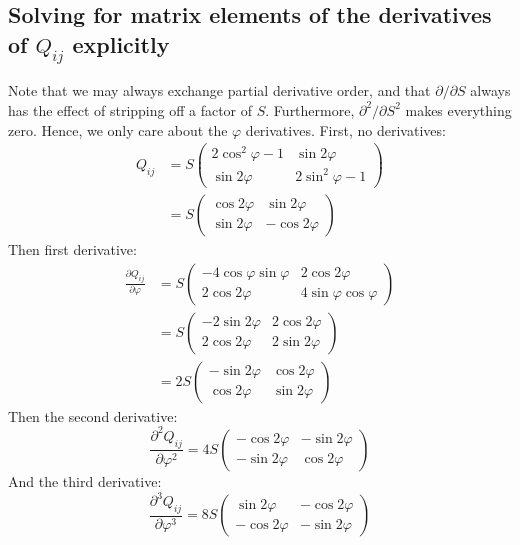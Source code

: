 \documentclass[reqno]{article}
\begin{document}
	\subsection{Solving for matrix elements of the derivatives of $Q_{ij}$ explicitly}
	Note that we may always exchange partial derivative order, and that $\partial/\partial S$ always has the effect of stripping off a factor of $S$. Furthermore, $\partial^2/\partial S^2$ makes everything zero. Hence, we only care about the $\varphi$ derivatives. First, no derivatives:
	\begin{equation}
	\begin{split}
		Q_{ij} &= S
		\begin{pmatrix}
			2\cos^2\varphi - 1 & \sin2\varphi \\
			\sin2\varphi & 2\sin^2\varphi - 1
		\end{pmatrix} \\
		&= S
		\begin{pmatrix}
			\cos2\varphi & \sin2\varphi \\
			\sin2\varphi & -\cos2\varphi
		\end{pmatrix}
	\end{split}
	\end{equation}
	Then first derivative:
	\begin{equation}
	\begin{split}
		\frac{\partial Q_{ij}}{\partial \varphi} &= S
		\begin{pmatrix}
			-4\cos\varphi\sin\varphi & 2\cos2\varphi \\
			2\cos2\varphi & 4\sin\varphi\cos\varphi
		\end{pmatrix} \\
		&= S
		\begin{pmatrix}
			-2\sin2\varphi & 2\cos2\varphi \\
			2\cos2\varphi & 2\sin2\varphi
		\end{pmatrix}\\
		&= 2S
		\begin{pmatrix}
		-\sin2\varphi & \cos2\varphi \\
		\cos2\varphi & \sin2\varphi
		\end{pmatrix}
	\end{split}
	\end{equation}
	Then the second derivative:
	\begin{equation}
		\frac{\partial^2 Q_{ij}}{\partial \varphi^2} = 4S
		\begin{pmatrix}
			-\cos2\varphi & -\sin2\varphi \\
			-\sin2\varphi & \cos2\varphi
		\end{pmatrix}
	\end{equation}
	And the third derivative:
	\begin{equation}
		\frac{\partial^3 Q_{ij}}{\partial \varphi^3} = 8S
		\begin{pmatrix}
			\sin2\varphi & -\cos2\varphi \\
			-\cos2\varphi & -\sin2\varphi
		\end{pmatrix}
	\end{equation}
	
\end{document}
